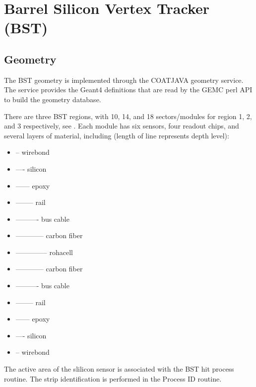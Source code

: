 \section{Barrel Silicon Vertex Tracker (BST)}


\subsection{Geometry}


The BST geometry is implemented through the COATJAVA geometry service.
The service provides the Geant4 definitions that are read by the GEMC perl API to build the geometry database.

There are three BST regions, with 10, 14, and 18 sectors/modules for region 1, 2, and 3 respectively, see .
Each module has six sensors, four readout chips, and several layers of material,
including (length of line represents depth level):

\begin{itemize}
	\item -- wirebond
	\item ---- silicon
	\item ------ epoxy
	\item -------- rail
	\item ---------- bus cable
	\item ------------ carbon fiber
	\item -------------- rohacell
	\item ------------ carbon fiber
	\item ---------- bus cable
	\item -------- rail
	\item ------ epoxy
	\item ---- silicon
	\item -- wirebond
\end{itemize}

The active area of the slilicon sensor is associated with the BST hit process routine.
The strip identification is performed in the Process ID routine.

